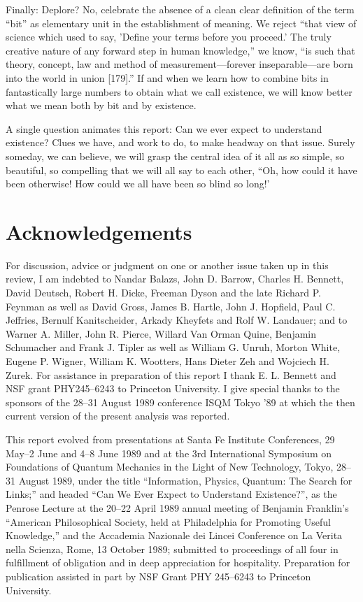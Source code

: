 \documentclass[11pt]{article}
\begin{document}
	Finally: Deplore? No, celebrate the absence of a clean clear definition of the
	term ``bit'' as elementary unit in the establishment of meaning. We reject ``that
	view of science which used to say, 'Define your terms before you proceed.' The
	truly creative nature of any forward step in human knowledge,'' we know, ``is such
	that theory, concept, law and method of measurement---forever inseparable---are
	born into the world in union [179].'' If and when we learn how to combine bits in
	fantastically large numbers to obtain what we call existence, we will know better
	what we mean both by bit and by existence.
	
	A single question animates this report: Can we ever expect to understand existence? Clues we have, and work to do, to make headway on that issue. Surely
	someday, we can believe, we will grasp the central idea of it all as so simple, so
	beautiful, so compelling that we will all say to each other, ``Oh, how could it have
	been otherwise! How could we all have been so blind so long!'
	
	\section*{Acknowledgements}
	For discussion, advice or judgment on one or another issue taken up in this review,
	I am indebted to Nandar Balazs, John D. Barrow, Charles H. Bennett, David
	Deutsch, Robert H. Dicke, Freeman Dyson and the late Richard P. Feynman as
	well as David Gross, James B. Hartle, John J. Hopfield, Paul C. Jeffries, Bernulf
	Kanitscheider, Arkady Kheyfets and Rolf W. Landauer; and to Warner A. Miller,
	John R. Pierce, Willard Van Orman Quine, Benjamin Schumacher and Frank J.
	Tipler as well as William G. Unruh, Morton White, Eugene P. Wigner, William K.
	Wootters, Hans Dieter Zeh and Wojciech H. Zurek. For assistance in preparation
	of this report I thank E. L. Bennett and NSF grant PHY245--6243 to Princeton
	University. I give special thanks to the sponsors of the 28--31 August 1989 conference
	ISQM Tokyo '89 at which the then current version of the present analysis was
	reported.
	
	This report evolved from presentations at Santa Fe Institute Conferences, 29
	May--2 June and 4--8 June 1989 and at the 3rd International Symposium on Foundations of Quantum Mechanics in the Light of New Technology, Tokyo, 28--31 August
	1989, under the title ``Information, Physics, Quantum: The Search for Links;'' and
	headed ``Can We Ever Expect to Understand Existence?'', as the Penrose Lecture
	at the 20--22 April 1989 annual meeting of Benjamin Franklin's ``American Philosophical Society, held at Philadelphia for Promoting Useful Knowledge,'' and the
	Accademia Nazionale dei Lincei Conference on La Verita nella Scienza, Rome, 13
	October 1989; submitted to proceedings of all four in fulfillment of obligation and
	in deep appreciation for hospitality. Preparation for publication assisted in part by
	NSF Grant PHY 245--6243 to Princeton University.
	
\end{document}
